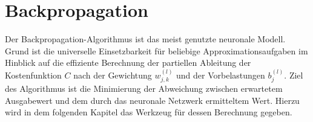 \section{Backpropagation}
Der Backpropagation-Algorithmus ist das meist genutzte neuronale Modell. Grund ist die universelle Einsetzbarkeit für beliebige Approximationsaufgaben im Hinblick auf die effiziente Berechnung der partiellen Ableitung der Kostenfunktion $C$ nach der Gewichtung $w_{j,k}^{(l)}$ und der Vorbelastungen $b_j^{(l)}$. Ziel des Algorithmus ist die Minimierung der Abweichung zwischen erwartetem Ausgabewert und dem durch das neuronale Netzwerk ermitteltem Wert. Hierzu wird in dem folgenden Kapitel das Werkzeug für dessen Berechnung gegeben. \\


